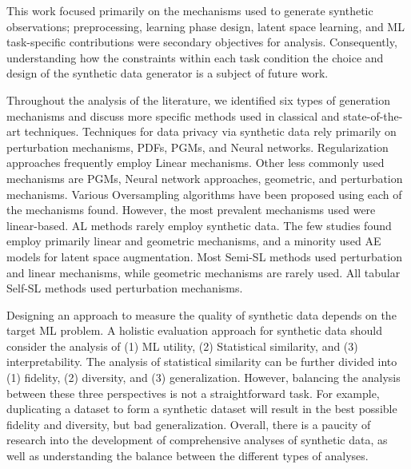 This work focused primarily on the mechanisms used to generate synthetic
observations; preprocessing, learning phase design, latent space learning, and
ML task-specific contributions were secondary objectives for analysis.
Consequently, understanding how the constraints within each task condition
the choice and design of the synthetic data generator is a subject of future
work.

Throughout the analysis of the literature, we identified six types of
generation mechanisms and discuss more specific methods used in classical and
state-of-the-art techniques. Techniques for data privacy via synthetic data
rely primarily on perturbation mechanisms, PDFs, PGMs, and Neural networks.
Regularization approaches frequently employ Linear mechanisms. Other less
commonly used mechanisms are PGMs, Neural network approaches, geometric, and
perturbation mechanisms. Various Oversampling algorithms have been proposed
using each of the mechanisms found. However, the most prevalent mechanisms
used were linear-based. AL methods rarely employ synthetic data. The few
studies found employ primarily linear and geometric mechanisms, and a minority
used AE models for latent space augmentation. Most Semi-SL methods used
perturbation and linear mechanisms, while geometric mechanisms are rarely
used. All tabular Self-SL methods used perturbation mechanisms. 

Designing an approach to measure the quality of synthetic data depends on the
target ML problem. A holistic evaluation approach for synthetic data should
consider the analysis of (1) ML utility, (2) Statistical similarity, and (3)
interpretability. The analysis of statistical similarity can be further
divided into (1) fidelity, (2) diversity, and (3) generalization.  However,
balancing the analysis between these three perspectives is not a
straightforward task. For example, duplicating a dataset to form a synthetic
dataset will result in the best possible fidelity and diversity, but bad
generalization. Overall, there is a paucity of research into the development
of comprehensive analyses of synthetic data, as well as understanding the
balance between the different types of analyses.

